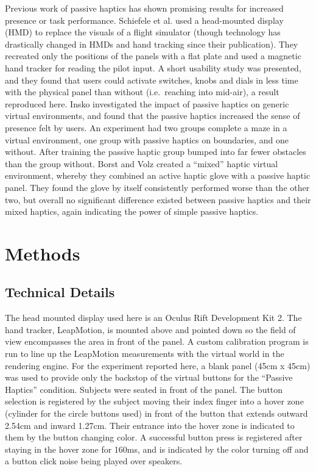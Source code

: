\documentclass[]{aiaa-tc}%
\begin{document}
Previous work of passive haptics has shown promising results for increased presence or task performance.
Schiefele et al.\cite{schiefele_simple_1998} used a head-mounted display (HMD) to replace the visuals of a flight simulator (though technology has drastically changed in HMDs and hand tracking since their publication).
They recreated only the positions of the panels with a flat plate and used a magnetic hand tracker for reading the pilot input.
A short usability study was presented, and they found that users could activate switches, knobs and dials in less time with the physical panel than without (i.e.\ reaching into mid-air), a result reproduced here.
Insko\cite{insko_passive_2001} investigated the impact of passive haptics on generic virtual environments, and found that the passive haptics increased the sense of presence felt by users.
An experiment had two groups complete a maze in a virtual environment, one group with passive haptics on boundaries, and one without.
After training the passive haptic group bumped into far fewer obstacles than the group without.
Borst and Volz\cite{borst_evaluation_2005} created a ``mixed'' haptic virtual environment, whereby they combined an active haptic glove with a passive haptic panel.
They found the glove by itself consistently performed worse than the other two, but overall no significant difference existed between passive haptics and their mixed haptics, again indicating the power of simple passive haptics.

\section{Methods}
\subsection{Technical Details}
The head mounted display used here is an Oculus Rift Development Kit 2.
The hand tracker, LeapMotion, is mounted above and pointed down so the field of view encompasses the area in front of the panel.
A custom calibration program is run to line up the LeapMotion measurements with the virtual world in the rendering engine.
For the experiment reported here, a blank panel (45cm x 45cm) was used to provide only the backstop of the virtual buttons for the ``Passive Haptics'' condition.
Subjects were seated in front of the panel.
The button selection is registered by the subject moving their index finger into a hover zone (cylinder for the circle buttons used) in front of the button that extends outward 2.54cm and inward 1.27cm.
Their entrance into the hover zone is indicated to them by the button changing color.
A successful button press is registered after staying in the hover zone for 160ms, and is indicated by the color turning off and a button click noise being played over speakers.
\end{document}
